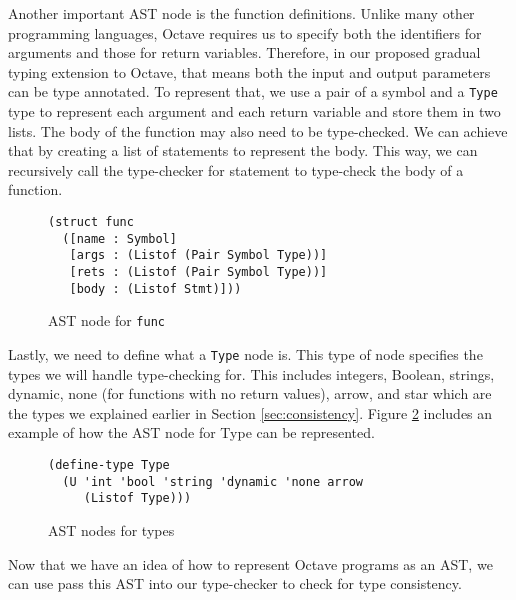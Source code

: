 Another important AST node is the function definitions. Unlike many other programming languages, Octave requires us to specify both the identifiers for arguments and those for return variables. Therefore, in our proposed gradual typing extension to Octave, that means both the input and output parameters can be type annotated. To represent that, we use a pair of a symbol and a {\tt Type} type to represent each argument and each return variable and store them in two lists. The body of the function may also need to be type-checked. We can achieve that by creating a list of statements to represent the body. This way, we can recursively call the type-checker for statement to type-check the body of a function.

\begin{figure}[h]
    \begin{lstlisting}[language=racket]
(struct func
  ([name : Symbol]
   [args : (Listof (Pair Symbol Type))]
   [rets : (Listof (Pair Symbol Type))]
   [body : (Listof Stmt)]))
    \end{lstlisting}
    \caption[]{AST node for {\tt func}}
    \label{fig:func}
\end{figure}

Lastly, we need to define what a {\tt Type} node is. This type of node specifies the types we will handle type-checking for. This includes integers, Boolean, strings, dynamic, none (for functions with no return values), arrow, and star which are the types we explained earlier in Section \ref{sec:consistency}. Figure \ref{fig:type} includes an example of how the AST node for Type can be represented.

\begin{figure}[h]
    \begin{lstlisting}[language=racket]
(define-type Type
  (U 'int 'bool 'string 'dynamic 'none arrow
     (Listof Type)))
    \end{lstlisting}
    \caption[]{AST nodes for types}
    \label{fig:type}
\end{figure}

Now that we have an idea of how to represent Octave programs as an AST, we can use pass this AST into our type-checker to check for type consistency. 

